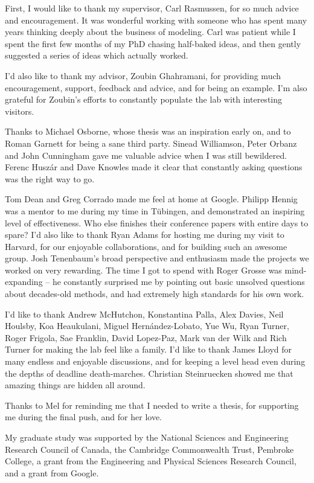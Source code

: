 
\begin{acknowledgements}      


First, I would like to thank my supervisor, Carl Rasmussen, for so much advice and encouragement.
It was wonderful working with someone who has spent many years thinking deeply about the business of modeling.
Carl was patient while I spent the first few months of my PhD chasing half-baked ideas, and then gently suggested a series of ideas which actually worked.

I'd also like to thank my advisor, Zoubin Ghahramani, for providing much encouragement, support, feedback and advice, and for being an example.
I'm also grateful for Zoubin's efforts to constantly populate the lab with interesting visitors.

Thanks to Michael Osborne, whose thesis was an inspiration early on, and to Roman Garnett for being a sane third party.
Sinead Williamson, Peter Orbanz and John Cunningham gave me valuable advice when I was still bewildered.
Ferenc Husz\'ar and Dave Knowles made it clear that constantly asking questions was the right way to go.

Tom Dean and Greg Corrado made me feel at home at Google.
Philipp Hennig was a mentor to me during my time in T\"{u}bingen, and demonstrated an inspiring level of effectiveness.
Who else finishes their conference papers with entire days to spare?
I'd also like to thank Ryan Adams for hosting me during my visit to Harvard, for our enjoyable collaborations, and for building such an awesome group.
Josh Tenenbaum's broad perspective and enthusiasm made the projects we worked on very rewarding.
The time I got to spend with Roger Grosse was mind-expanding -- he constantly surprised me by pointing out basic unsolved questions about decades-old methods, and had extremely high standards for his own work.

I'd like to thank Andrew McHutchon, Konstantina Palla, Alex Davies, Neil Houlsby, Koa Heaukulani, Miguel Hern\'{a}ndez-Lobato, Yue Wu, Ryan Turner, Roger Frigola, Sae Franklin, David Lopez-Paz, Mark van der Wilk and Rich Turner for making the lab feel like a family.
I'd like to thank James Lloyd for many endless and enjoyable discussions, and for keeping a level head even during the depths of deadline death-marches.
Christian Steinruecken showed me that amazing things are hidden all around.

Thanks to Mel for reminding me that I needed to write a thesis, for supporting me during the final push, and for her love.

My graduate study was supported by the National Sciences and Engineering Research Council of Canada, the Cambridge Commonwealth Trust, Pembroke College, a grant from the Engineering and Physical Sciences Research Council, and a grant from Google.

\end{acknowledgements}
